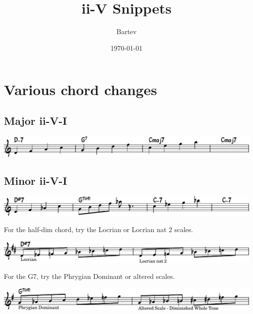 \documentclass[11pt]{article}
\author{Bartev}
\date{\today}
\title{ii-V Snippets}
\let\maketitle\relax %
\begin{document}
\maketitle

\section*{Various chord changes}
\label{sec:orgaf51e64}

\subsection*{Major ii-V-I}
\label{sec:orgcd6efbb}
\begin{center}
\includegraphics[width=.9\linewidth]{major_ii_v_i.pdf}
\end{center}

\subsection*{Minor ii-V-I}
\label{sec:org6b5d222}

\begin{center}
\includegraphics[width=.9\linewidth]{minor_ii_v_i.pdf}
\end{center}

For the half-dim chord, try the Locrian or Locrian nat 2 scales.

\begin{center}
\includegraphics[width=.9\linewidth]{locrian.pdf}
\end{center}

For the G7, try the Phrygian Dominant or altered scales.

\begin{center}
\includegraphics[width=.9\linewidth]{phryg_dom.pdf}
\end{center}
\end{document}
